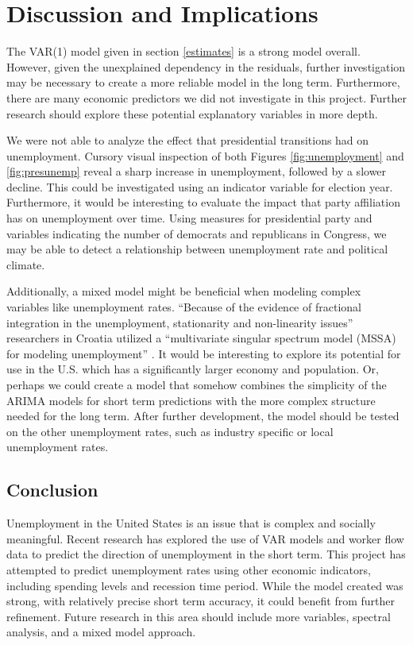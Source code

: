 \documentclass[twoside,twocolumn]{article}
\begin{document}
\section{Discussion and Implications}

The VAR(1) model given in section \ref{estimates} is a strong model overall. However, given the unexplained dependency in the residuals, further investigation may be necessary to create a more reliable model in the long term. Furthermore, there are many economic predictors we did not investigate in this project. Further research should explore these potential explanatory variables in more depth.

We were not able to analyze the effect that presidential transitions had on unemployment.  Cursory visual inspection of both Figures \ref{fig:unemployment} and \ref{fig:presunemp} reveal a sharp increase in unemployment, followed by a slower decline.   This could be investigated using an indicator variable for election year.  Furthermore, it would be interesting to evaluate the impact that party affiliation has on unemployment over time.  Using measures for presidential party and variables indicating the number of democrats and republicans in Congress, we may be able to detect a relationship between unemployment rate and political climate.

Additionally, a mixed model might be beneficial when modeling complex variables like unemployment rates.  ``Because of the evidence of fractional integration in the unemployment, stationarity and non-linearity issues'' researchers in Croatia utilized a ``multivariate singular spectrum model (MSSA) for modeling unemployment'' \citep{Skare2015}. It would be interesting to explore its potential for use in the U.S. which has a significantly larger economy and population.  Or, perhaps we could create a model that somehow combines the simplicity of the ARIMA models for short term predictions with the more complex structure needed for the long term. After further development, the model should be tested on the other unemployment rates, such as industry specific or local unemployment rates.

\subsection{Conclusion}

Unemployment in the United States is an issue that is complex and socially meaningful. Recent research has explored the use of VAR models and worker flow data to predict the direction of unemployment in the short term. This project has attempted to predict unemployment rates using other economic indicators, including spending levels and recession time period. While the model created was strong, with relatively precise short term accuracy, it could benefit from further refinement. Future research in this area should include more variables, spectral analysis, and a mixed model approach. 
\end{document}

